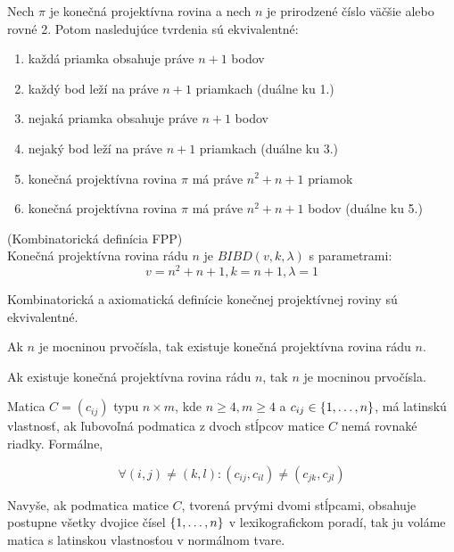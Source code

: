 \begin{theorem}
Nech $\pi$ je konečná projektívna rovina 
a nech $n$ je prirodzené 
číslo väčšie alebo rovné 2. 
Potom nasledujúce tvrdenia sú ekvivalentné:
\begin{enumerate}
    \item každá priamka obsahuje práve $n+1$ bodov
    \item každý bod leží na práve $n+1$ priamkach (duálne ku 1.)
    \item nejaká priamka obsahuje práve $n+1$ bodov
    \item nejaký bod leží na práve $n+1$ priamkach (duálne ku 3.)
    \item konečná projektívna rovina $\pi$ má práve $n^2+n+1$ priamok
    \item konečná projektívna rovina $\pi$ má práve $n^2+n+1$ bodov (duálne ku 5.)
\end{enumerate}
\end{theorem}


\begin{definition}{(Kombinatorická definícia FPP)}\\
Konečná projektívna rovina rádu $n$ je $BIBD(v, k, \lambda)$ s parametrami:
$$v = n^2 + n + 1, k = n + 1, \lambda = 1$$
\end{definition}

\begin{theorem}
Kombinatorická a axiomatická definície konečnej projektívnej roviny sú ekvivalentné. 
\end{theorem}

\begin{theorem_hard}
Ak $n$ je mocninou prvočísla, tak existuje konečná projektívna rovina rádu $n$.
\end{theorem_hard}

\begin{hypothesis}
Ak existuje konečná projektívna rovina rádu $n$, tak $n$ je mocninou prvočísla.
\end{hypothesis}

\begin{definition}

Matica $C = (c_{ij})$ typu $n \times m$, kde $n \geq 4, m \geq 4$ a $c_{ij} \in \left\{1, \ldots, n\right\}$,  
má latinskú vlastnosť, ak ľubovoľná podmatica z dvoch stĺpcov matice $C$ nemá rovnaké riadky. Formálne,

$$\forall (i, j) \neq (k, l): (c_{ij}, c_{il}) \neq (c_{jk}, c_{jl})$$

Navyše, ak podmatica matice $C$, tvorená prvými dvomi stĺpcami, obsahuje postupne všetky dvojice čísel $\left\{1, \ldots, n\right\}$
v lexikografickom poradí, tak ju voláme matica s latinskou vlastnosťou v normálnom tvare.
\end{definition}

